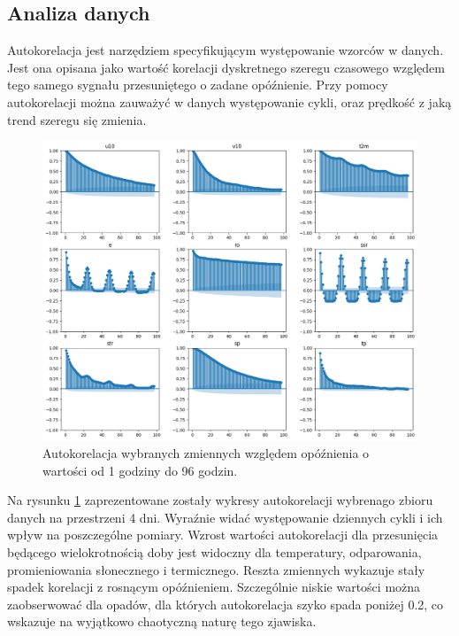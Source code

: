 \subsection{Analiza danych}

Autokorelacja jest narzędziem specyfikującym występowanie wzorców w danych. Jest ona 
opisana jako wartość korelacji dyskretnego szeregu czasowego względem tego samego sygnału
przesuniętego o zadane opóźnienie. Przy pomocy autokorelacji można zauważyć w danych
występowanie cykli, oraz prędkość z jaką trend szeregu się zmienia.

\begin{figure}[H]
    \centering
    \includegraphics[width=\textwidth]{images/autocorrelation.png}
    \caption{Autokorelacja wybranych zmiennych względem opóźnienia o wartości od 
    1 godziny do 96 godzin.}
    \label{autocorrelation}
\end{figure}

Na rysunku \ref{autocorrelation} zaprezentowane zostały wykresy autokorelacji wybrenago
zbioru danych na przestrzeni 4 dni. Wyraźnie widać występowanie dziennych cykli i ich wpływ
na poszczególne pomiary. Wzrost wartości autokorelacji dla przesunięcia będącego
wielokrotnością doby jest widoczny dla temperatury, odparowania, promieniowania słonecznego i 
termicznego. Reszta zmiennych wykazuje stały spadek korelacji z rosnącym opóźnieniem. 
Szczególnie niskie wartości można zaobserwować dla opadów, dla których autokorelacja szyko spada
poniżej 0.2, co wskazuje na wyjątkowo chaotyczną naturę tego zjawiska.

